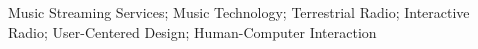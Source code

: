 \noindent Music Streaming Services; Music Technology; Terrestrial Radio; Interactive Radio; User-Centered Design; Human-Computer Interaction